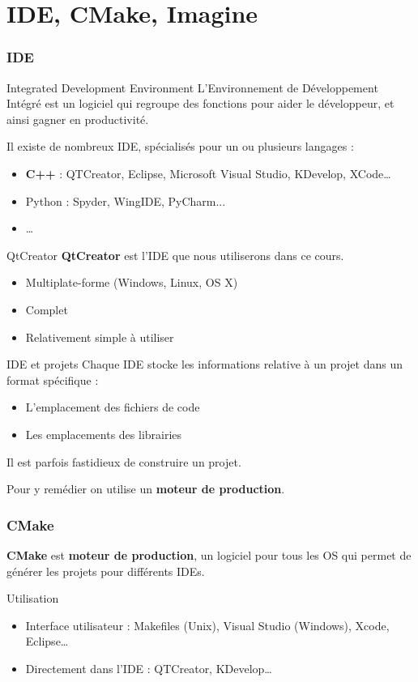 \section{IDE, CMake, Imagine}

\begin{frame}
  \frametitle{IDE}

  \begin{block}{Integrated Development Environment}
      L'Environnement de Développement Intégré est un logiciel qui regroupe des fonctions pour aider le développeur, et ainsi gagner en productivité.
  \end{block}

  Il existe de nombreux IDE, spécialisés pour un ou plusieurs langages :
  \begin{itemize}
  \item \textbf{C++} : QTCreator, Eclipse, Microsoft Visual Studio, KDevelop, XCode\dots
  \item Python : Spyder, WingIDE, PyCharm...
  \item \dots
  \end{itemize}
\end{frame}

\begin{frame}{QtCreator}
    \textbf{QtCreator} est l'IDE que nous utiliserons dans ce cours.
    \begin{itemize}
        \item Multiplate-forme (Windows, Linux, OS X)
        \item Complet
        \item Relativement simple à utiliser
    \end{itemize}
\end{frame}

\begin{frame}{IDE et projets}
    Chaque IDE stocke les informations relative à un projet dans un format spécifique :
    \begin{itemize}
        \item L'emplacement des fichiers de code
        \item Les emplacements des librairies
    \end{itemize}
    Il est parfois fastidieux de construire un projet.

    Pour y remédier on utilise un \textbf{moteur de production}.

\end{frame}

\begin{frame}
  \frametitle{CMake}
  \textbf{CMake} est \textbf{moteur de production},  un logiciel pour tous les OS qui permet de générer les projets pour différents IDEs.

  \begin{block}{Utilisation}
	  \begin{itemize}
		  \item Interface utilisateur : Makefiles (Unix), Visual Studio (Windows), Xcode, Eclipse\dots
		  \item Directement dans l'IDE : QTCreator, KDevelop\dots
	  \end{itemize}
  \end{block}
\end{frame}

